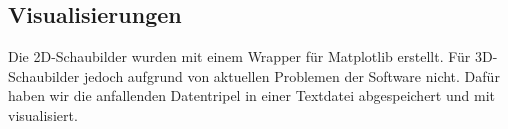 \subsection{Visualisierungen}
Die 2D-Schaubilder wurden mit einem Wrapper für Matplotlib \cite{matplotlibwrapper} erstellt. Für 3D-Schaubilder jedoch aufgrund von aktuellen Problemen
der Software nicht. Dafür haben wir die anfallenden Datentripel in einer Textdatei abgespeichert und mit \cite{gnuplot} visualisiert. 